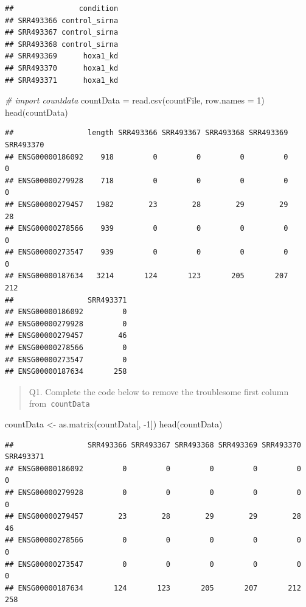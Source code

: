 \documentclass[
]{article}
\newenvironment{Shaded}{\begin{snugshade}}{\end{snugshade}}
\newcommand{\AttributeTok}[1]{\textcolor[rgb]{0.77,0.63,0.00}{#1}}
\newcommand{\CommentTok}[1]{\textcolor[rgb]{0.56,0.35,0.01}{\textit{#1}}}
\newcommand{\DecValTok}[1]{\textcolor[rgb]{0.00,0.00,0.81}{#1}}
\newcommand{\FunctionTok}[1]{\textcolor[rgb]{0.00,0.00,0.00}{#1}}
\newcommand{\NormalTok}[1]{#1}
\newcommand{\OtherTok}[1]{\textcolor[rgb]{0.56,0.35,0.01}{#1}}
\newcommand{\SpecialCharTok}[1]{\textcolor[rgb]{0.00,0.00,0.00}{#1}}
\begin{document}
\begin{verbatim}
##               condition
## SRR493366 control_sirna
## SRR493367 control_sirna
## SRR493368 control_sirna
## SRR493369      hoxa1_kd
## SRR493370      hoxa1_kd
## SRR493371      hoxa1_kd
\end{verbatim}

\begin{Shaded}
\begin{Highlighting}[]
\CommentTok{\# import countdata}
\NormalTok{countData }\OtherTok{=} \FunctionTok{read.csv}\NormalTok{(countFile, }\AttributeTok{row.names =} \DecValTok{1}\NormalTok{)}
\FunctionTok{head}\NormalTok{(countData)}
\end{Highlighting}
\end{Shaded}

\begin{verbatim}
##                 length SRR493366 SRR493367 SRR493368 SRR493369 SRR493370
## ENSG00000186092    918         0         0         0         0         0
## ENSG00000279928    718         0         0         0         0         0
## ENSG00000279457   1982        23        28        29        29        28
## ENSG00000278566    939         0         0         0         0         0
## ENSG00000273547    939         0         0         0         0         0
## ENSG00000187634   3214       124       123       205       207       212
##                 SRR493371
## ENSG00000186092         0
## ENSG00000279928         0
## ENSG00000279457        46
## ENSG00000278566         0
## ENSG00000273547         0
## ENSG00000187634       258
\end{verbatim}

\begin{quote}
Q1. Complete the code below to remove the troublesome first column
from~\texttt{countData}
\end{quote}

\begin{Shaded}
\begin{Highlighting}[]
\NormalTok{countData }\OtherTok{\textless{}{-}} \FunctionTok{as.matrix}\NormalTok{(countData[, }\SpecialCharTok{{-}}\DecValTok{1}\NormalTok{])}
\FunctionTok{head}\NormalTok{(countData)}
\end{Highlighting}
\end{Shaded}

\begin{verbatim}
##                 SRR493366 SRR493367 SRR493368 SRR493369 SRR493370 SRR493371
## ENSG00000186092         0         0         0         0         0         0
## ENSG00000279928         0         0         0         0         0         0
## ENSG00000279457        23        28        29        29        28        46
## ENSG00000278566         0         0         0         0         0         0
## ENSG00000273547         0         0         0         0         0         0
## ENSG00000187634       124       123       205       207       212       258
\end{verbatim}
\end{document}
